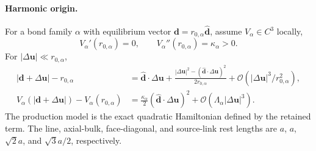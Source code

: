\documentclass[10pt,aps,onecolumn,notitlepage,nofootinbib]{revtex4-2}
\newcommand{\vu}{\bm u}
\newcommand{\order}{\mathcal O}
\begin{document}
\paragraph*{Harmonic origin.}
For a bond family $\alpha$ with equilibrium vector $\bm d=r_{0,\alpha}\hat{\bm d}$, assume $V_\alpha\in C^3$ locally,
\begin{equation}
 V_\alpha'(r_{0,\alpha})=0,
 \qquad V_\alpha''(r_{0,\alpha})=\kappa_\alpha>0.
\end{equation}
For $|\Delta\vu|\ll r_{0,\alpha}$,
\begin{align}
 |\bm d+\Delta\vu|-r_{0,\alpha}
 &=\hat{\bm d}\cdot\Delta\vu
 +\frac{|\Delta\vu|^2-(\hat{\bm d}\cdot\Delta\vu)^2}{2r_{0,\alpha}}
 +\order(|\Delta\vu|^3/r_{0,\alpha}^2),\\
 V_\alpha(|\bm d+\Delta\vu|)-V_\alpha(r_{0,\alpha})
 &=\frac{\kappa_\alpha}{2}(\hat{\bm d}\cdot\Delta\vu)^2
 +\order(\Lambda_\alpha|\Delta\vu|^3).
\end{align}
The production model is the exact quadratic Hamiltonian defined by the retained term.  The line, axial-bulk, face-diagonal, and source-link rest lengths are $a$, $a$, $\sqrt2a$, and $\sqrt3a/2$, respectively.
\end{document}
